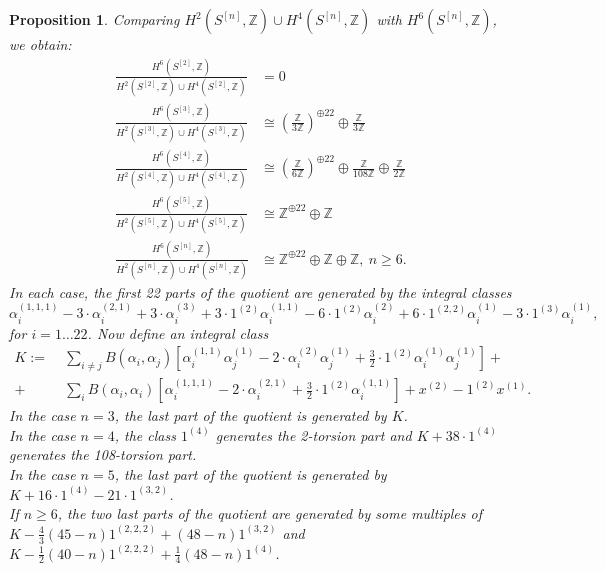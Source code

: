 \documentclass{amsart}
\newcommand{\hilb}[1]{^{[#1]}}
\newcommand{\One}{1}
\newcommand{\IZ}{\mathbb{Z}}
\theoremstyle{plain}
\newtheorem{proposition}[theorem]{Proposition}
\theoremstyle{definition}
\theoremstyle{remark}
\begin{document}
\begin{proposition} Comparing $H^2(S\hilb{n},\IZ) \cup H^4(S\hilb{n},\IZ) $ with $H^6(S\hilb{n},\IZ) $, we obtain:
\begin{align} 
\frac{H^6(S\hilb{2},\IZ) }{H^2(S\hilb{2},\IZ)\cup H^4(S\hilb{2},\IZ)} &= 0 
\\
\frac{H^6(S\hilb{3},\IZ)}{H^2(S\hilb{3},\IZ)\cup H^4(S\hilb{3},\IZ)} &\cong \left(\frac{\IZ}{3\IZ}\right)^{\oplus 22} \oplus \frac{\IZ}{3\IZ}
\\
\frac{H^6(S\hilb{4},\IZ)}{H^2(S\hilb{4},\IZ)\cup H^4(S\hilb{4},\IZ)} &\cong  \left(\frac{\IZ}{6\IZ}\right)^{\oplus 22}\oplus\frac{\IZ}{108\IZ} \oplus\frac{\IZ}{2\IZ} 
\\
\frac{H^6(S\hilb{5},\IZ)}{H^2(S\hilb{5},\IZ)\cup H^4(S\hilb{5},\IZ)} &\cong 
 \IZ^{\oplus 22} \oplus \IZ
\\
\frac{H^6(S\hilb{n},\IZ)}{H^2(S\hilb{n},\IZ)\cup H^4(S\hilb{n},\IZ)} &\cong 
 \IZ^{\oplus 22} \oplus \IZ\oplus\IZ, \ n\geq 6.
\end{align}
In each case, the first 22 parts of the quotient are generated by the integral classes 
 $$
\alpha_i^{(1,1,1)} -3\cdot \alpha_i^{(2,1)} + 3\cdot \alpha_i^{(3)}+ 3 \cdot \One^{(2)}\alpha_i^{(1,1)} -6\cdot \One^{(2)}\alpha_i^{(2)}+6\cdot \One^{(2,2)}\alpha_i^{(1)}-3\cdot \One^{(3)}\alpha_i^{(1)},
$$ 
for $ i=1\ldots 22$. Now define an integral class
\begin{align*}
K:=&\;\sum_{i\neq j} B(\alpha_i,\alpha_j)\left[\alpha_i^{(1,1)}\alpha_j^{(1)} - 2\cdot\alpha_i^{(2)}\alpha_j^{(1)}+\frac{3}{2}\cdot \One^{(2)}\alpha_i^{(1)}\alpha_j^{(1)} \right] +\\
+&\;\sum_{i}B(\alpha_i,\alpha_i)\left[\alpha_i^{(1,1,1)} - 2\cdot\alpha_i^{(2,1)} + \frac{3}{2}\cdot \One^{(2)}\alpha_i^{(1,1)} \right]+  x^{(2)}-\One^{(2)}x^{(1)}.
\end{align*} 
In the case $n=3$, the last part of the quotient is generated by $K$. 
\\In the case $n=4$, the class $ \One^{(4)}$ generates the 2-torsion part and $K+38\cdot\One^{(4)}$ generates the 108-torsion part.
\\In the case $n=5$, the last part of the quotient is generated by $K + 16\cdot \One^{(4)} - 21\cdot \One^{(3,2)}$.\\
If $n\geq 6$, the two last parts of the quotient are generated by some multiples of $K -\frac{4}{3}(45-n)\One^{(2,2,2)} + (48-n)\One^{(3,2)}$ and $K-\frac{1}{2}(40-n)\One^{(2,2,2)}+ \frac{1}{4}(48-n)\One^{(4)}$.
\end{proposition}




\end{document}
